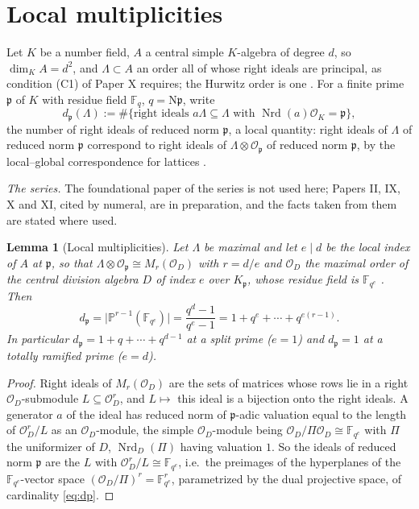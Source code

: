 \documentclass[11pt]{amsart}
\numberwithin{equation}{section}
\newtheorem{lemma}[theorem]{Lemma}
\theoremstyle{definition}
\theoremstyle{remark}
\newcommand{\F}{\mathbb{F}}
\newcommand{\cO}{\mathcal{O}}
\newcommand{\pp}{\mathfrak{p}}
\newcommand{\Ns}{\mathrm{N}}
\newcommand{\Nrd}{\operatorname{Nrd}}
\begin{document}
\maketitle

\section{Local multiplicities}

Let $K$ be a number field, $A$ a central simple $K$-algebra of degree $d$, so
$\dim_KA=d^2$, and $\Lambda\subset A$ an order all of whose right ideals are principal, as
condition (C1) of Paper X requires; the Hurwitz order is one \cite{Reiner,Vigneras}. For a
finite prime $\pp$ of $K$ with residue field $\F_q$, $q=\Ns\pp$, write
\[
d_\pp(\Lambda):=\#\bigl\{\text{right ideals }a\Lambda\subseteq\Lambda\text{ with }\Nrd(a)\cO_K=\pp\bigr\},
\]
the number of right ideals of reduced norm $\pp$, a local quantity: right ideals of
$\Lambda$ of reduced norm $\pp$ correspond to right ideals of $\Lambda\otimes\cO_\pp$ of
reduced norm $\pp$, by the local--global correspondence for lattices \cite{Reiner}.

\emph{The series.} The foundational paper of the series is not used here; Papers II, IX, X
and XI, cited by numeral, are in preparation, and the facts taken from them are stated where
used.

\begin{lemma}[Local multiplicities]\label{lem:split}
Let $\Lambda$ be maximal and let $e\mid d$ be the local index of $A$ at $\pp$, so that
$\Lambda\otimes\cO_\pp\cong M_{r}(\cO_D)$ with $r=d/e$ and $\cO_D$ the maximal order of the
central division algebra $D$ of index $e$ over $K_\pp$, whose residue field is $\F_{q^e}$
\cite[Ch.~3]{Reiner}. Then
\begin{equation}\label{eq:dp}
d_\pp=\bigl|\mathbb P^{r-1}(\F_{q^e})\bigr|=\frac{q^{d}-1}{q^{e}-1}=1+q^e+\cdots+q^{e(r-1)} .
\end{equation}
In particular $d_\pp=1+q+\cdots+q^{d-1}$ at a split prime ($e=1$) and $d_\pp=1$ at a totally
ramified prime ($e=d$).
\end{lemma}

\begin{proof}
Right ideals of $M_r(\cO_D)$ are the sets of matrices whose rows lie in a right
$\cO_D$-submodule $L\subseteq\cO_D^r$, and $L\mapsto$ this ideal is a bijection onto the
right ideals. A generator $a$ of the ideal has reduced norm of $\pp$-adic valuation equal
to the length of $\cO_D^r/L$ as an $\cO_D$-module, the simple $\cO_D$-module being
$\cO_D/\Pi\cO_D\cong\F_{q^e}$ with $\Pi$ the uniformizer of $D$, $\Nrd_D(\Pi)$ having
valuation $1$. So the ideals of reduced norm $\pp$ are the $L$ with $\cO_D^r/L\cong\F_{q^e}$,
i.e.\ the preimages of the hyperplanes of the $\F_{q^e}$-vector space
$(\cO_D/\Pi)^r=\F_{q^e}^r$, parametrized by the dual projective space, of cardinality
\eqref{eq:dp}.
\end{proof}
\end{document}
